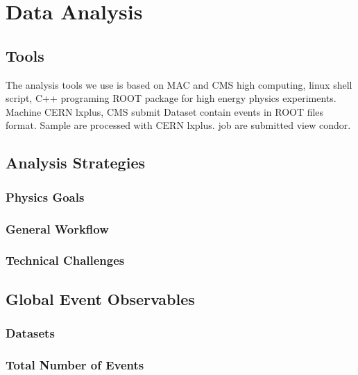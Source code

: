 \chapter{Data Analysis}

\section{Tools}

The analysis tools we use is based on MAC and CMS high computing, linux shell script, C++ programing ROOT package for high energy physics experiments. Machine CERN lxplus, CMS submit Dataset contain events in ROOT files format. Sample are processed with CERN lxplus. job are submitted view condor.

\section{Analysis Strategies}

\subsection{Physics Goals}

\subsection{General Workflow}

\subsection{Technical Challenges}

\section{Global Event Observables} 

\subsection{Datasets}

\subsection{Total Number of Events}

